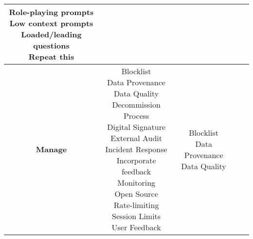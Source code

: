 \documentclass[fleqn]{article}
\begin{document}
\begin{landscape}
\begin{table}[H]
\begin{tabular}{|c|c|c|c|c|}
{			\textbullet\hspace{3pt} Role-playing prompts \\
			\textbullet\hspace{3pt} Low context prompts \\ 
			\textbullet\hspace{3pt} Loaded/leading questions  \\ 
			\textbullet\hspace{3pt} Repeat this \\
		}
		& \\
		\hline
		\textbf{Manage} & \makecell[l]{
			\textbullet\hspace{3pt} Blocklist \\
			\textbullet\hspace{3pt} Data Provenance\\
			\textbullet\hspace{3pt} Data Quality\\  	 
			\textbullet\hspace{3pt} Decommission Process\\ 
			\textbullet\hspace{3pt} Digital Signature\\ 	
			\textbullet\hspace{3pt} External Audit\\ 
			\textbullet\hspace{3pt} Incident Response\\ 
			\textbullet\hspace{3pt} Incorporate feedback \\ 
			\textbullet\hspace{3pt} Monitoring\\ 	
			\textbullet\hspace{3pt} Open Source\\ 
			\textbullet\hspace{3pt} Rate-limiting \\ 	
			\textbullet\hspace{3pt} Session Limits\\ 	
			\textbullet\hspace{3pt} User Feedback\\ 					 	 
		} 
		& \makecell[l]{
			\textbullet\hspace{3pt} Blocklist \\
			\textbullet\hspace{3pt} Data Provenance\\
			\textbullet\hspace{3pt} Data Quality\\  	 
}
\end{tabular}
\end{table}
\end{landscape}
\end{document}
